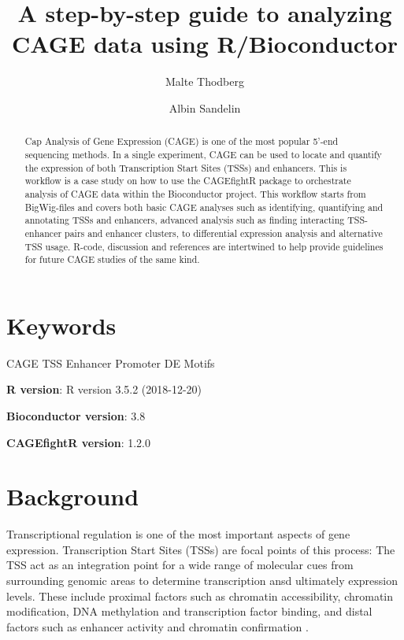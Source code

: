 \documentclass[9pt,a4paper,]{extarticle}
\begin{document}
\pagestyle{front}

\title{A step-by-step guide to analyzing CAGE data using R/Bioconductor}

\author[1]{Malte Thodberg}
\author[1]{Albin Sandelin}

\maketitle
\thispagestyle{front}

\begin{abstract}
Cap Analysis of Gene Expression (CAGE) is one of the most popular 5'-end sequencing methods. In a single experiment, CAGE can be used to locate and quantify the expression of both Transcription Start Sites (TSSs) and enhancers. This is workflow is a case study on how to use the CAGEfightR package to orchestrate analysis of CAGE data within the Bioconductor project. This workflow starts from BigWig-files and covers both basic CAGE analyses such as identifying, quantifying and annotating TSSs and enhancers, advanced analysis such as finding interacting TSS-enhancer pairs and enhancer clusters, to differential expression analysis and alternative TSS usage. R-code, discussion and references are intertwined to help provide guidelines for future CAGE studies of the same kind.
\end{abstract}

\section*{Keywords}
CAGE TSS Enhancer Promoter DE Motifs


\clearpage
\pagestyle{main}

\textbf{R version}: R version 3.5.2 (2018-12-20)

\textbf{Bioconductor version}: 3.8

\textbf{CAGEfightR version}: 1.2.0

\section{Background}\label{background}

Transcriptional regulation is one of the most important aspects of gene expression. Transcription Start Sites (TSSs) are focal points of this process: The TSS act as an integration point for a wide range of molecular cues from surrounding genomic areas to determine transcription ansd ultimately expression levels. These include proximal factors such as chromatin accessibility, chromatin modification, DNA methylation and transcription factor binding, and distal factors such as enhancer activity and chromatin confirmation \citep{Smale2003, Kadonaga2012, Lenhard2012, Haberle2018}.
\end{document}
